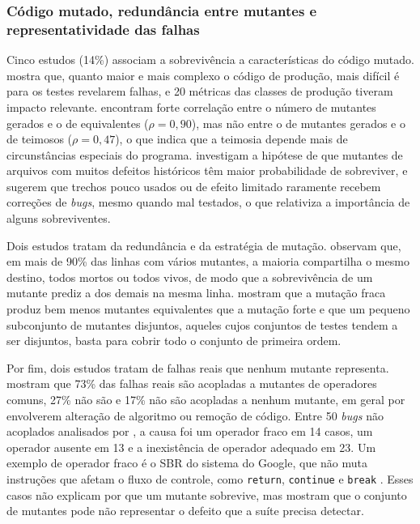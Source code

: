 \subsubsection{Código mutado, redundância entre mutantes e representatividade das falhas}
\label{subsubsec:codigo-redundancia-representatividade}

Cinco estudos (14\%) associam a sobrevivência a características do código mutado.  mostra que, quanto maior e mais complexo o código de produção, mais difícil é para os testes revelarem falhas, e 20 métricas das classes de produção tiveram impacto relevante.  encontram forte correlação entre o número de mutantes gerados e o de equivalentes ($\rho = 0,90$), mas não entre o de mutantes gerados e o de teimosos ($\rho = 0,47$), o que indica que a teimosia depende mais de circunstâncias especiais do programa.  investigam a hipótese de que mutantes de arquivos com muitos defeitos históricos têm maior probabilidade de sobreviver, e  sugerem que trechos pouco usados ou de efeito limitado raramente recebem correções de \textit{bugs}, mesmo quando mal testados, o que relativiza a importância de alguns sobreviventes.

Dois estudos tratam da redundância e da estratégia de mutação.  observam que, em mais de 90\% das linhas com vários mutantes, a maioria compartilha o mesmo destino, todos mortos ou todos vivos, de modo que a sobrevivência de um mutante prediz a dos demais na mesma linha.  mostram que a mutação fraca produz bem menos mutantes equivalentes que a mutação forte e que um pequeno subconjunto de mutantes disjuntos, aqueles cujos conjuntos de testes tendem a ser disjuntos, basta para cobrir todo o conjunto de primeira ordem.

Por fim, dois estudos tratam de falhas reais que nenhum mutante representa.  mostram que 73\% das falhas reais são acopladas a mutantes de operadores comuns, 27\% não são e 17\% não são acopladas a nenhum mutante, em geral por envolverem alteração de algoritmo ou remoção de código. Entre 50 \textit{bugs} não acoplados analisados por , a causa foi um operador fraco em 14 casos, um operador ausente em 13 e a inexistência de operador adequado em 23. Um exemplo de operador fraco é o SBR do sistema do Google, que não muta instruções que afetam o fluxo de controle, como \texttt{return}, \texttt{continue} e \texttt{break} \cite{petrovic2021}. Esses casos não explicam por que um mutante sobrevive, mas mostram que o conjunto de mutantes pode não representar o defeito que a suíte precisa detectar.

